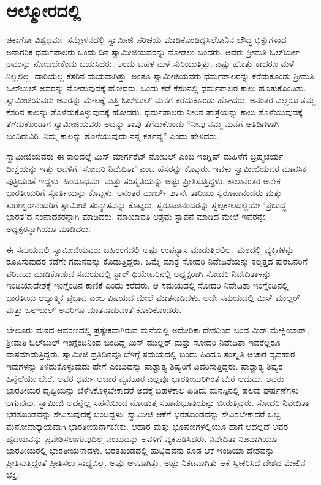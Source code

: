 
\chapter{ಆಲ್ಮೋರದಲ್ಲಿ}

 ಚಿಕಾಗೋ ವಿಶ್ವಧರ್ಮ ಸಮ್ಮೇಳನದಲ್ಲಿ ಸ್ವಾಮೀಜಿ ಪರಿಚಯ ಮಾಡಿಕೊಂಡಿದ್ದ\break ಸಿಲೋನಿನ ಬೌದ್ಧ ಭಿಕ್ಷುಗಳಾದ ಅನಾಗರಿಕ ಧರ್ಮಪಾಲರು ಒಂದು ದಿನ ಸ್ವಾಮೀಜಿಯವರನ್ನು ನೋಡಲು ಬಂದರು. ಅವರು ಶ‍್ರೀಮತಿ ಓಲ್‍ಬುಲ್ ಅವರನ್ನು ನೋಡಬೇಕೆಂದು ಬಯಸಿದರು. ಅಂದು ಬಹಳ ಮಳೆ ಸುರಿಯುತ್ತಿತ್ತು. ಎಷ್ಟು ಹೊತ್ತು ಕಾದರೂ ಮಳೆ ನಿಲ್ಲಲಿಲ್ಲ. ದಾರಿಯೆಲ್ಲ ಕೆಸರಿನ ಮಯವಾಗಿತ್ತು. ಅಂತೂ ಸ್ವಾಮೀಜಿಯವರು ಧರ್ಮಪಾಲರನ್ನು ಕರೆದುಕೊಂಡು ಶ‍್ರೀಮತಿ ಓಲ್‍ಬುಲ್ ಅವರನ್ನು ನೋಡುವುದಕ್ಕೆ ಹೋದರು. ಒಂದು ಕಡೆ ಕೆಸರಿನಲ್ಲಿ ಧರ್ಮಪಾಲರ ಕಾಲು ಹೂತುಕೊಂಡಿತು. ಸ್ವಾಮೀಜಿಯವರು ಅವರನ್ನು ಮೇಲಕ್ಕೆ ಎತ್ತಿ ಓಲ್‍ಬುಲ್ ಮನೆಗೆ ಕರೆದುಕೊಂಡು ಹೋದರು. ಅನಂತರ ಎಲ್ಲರೂ ತಮ್ಮ ಕೆಸರಿನ ಕಾಲನ್ನು ತೊಳೆದುಕೊಳ್ಳುವುದಕ್ಕೆ ಹೋದರು. ಧರ್ಮಪಾಲರು ನೀರಿನ ಪಾತ್ರೆಯನ್ನು ಕಾಲು ತೊಳೆಯುವುದಕ್ಕೆ ತೆಗೆದುಕೊಂಡಾಗ ಸ್ವಾಮೀಜಿಯವರು ಅದನ್ನು ತಾವು ತೆಗೆದುಕೊಂಡು “ನೀವು ನಮ್ಮ ಮನೆಗೆ ಅತಿಥಿಗಳಾಗಿ ಬಂದಿರುವಿರಿ. ನಿಮ್ಮ ಕಾಲನ್ನು ತೊಳೆಯುವುದು ನನ್ನ ಕರ್ತವ್ಯ” ಎಂದು ಹೇಳಿದರು. 

 ಸ್ವಾಮೀಜಿಯವರು ಈ ಕಾಲದಲ್ಲೆ ಮಿಸ್ ಮಾರ್ಗರೆಟ್ ನೋಬಲ್ ಎಂಬ ಇಂಗ್ಲಿಷ್ ಮಹಿಳೆಗೆ ಬ್ರಹ್ಮಚರ್ಯ ದೀಕ್ಷೆಯನ್ನು ಇತ್ತು ಅವಳಿಗೆ ‘ಸೋದರಿ ನಿವೇದಿತಾ’ ಎಂಬ ಹೆಸರನ್ನು ಕೊಟ್ಟರು. ಇವಳು ಸ್ವಾಮೀಜಿಯವರ ಮಾನಸಿಕ ಪುತ್ರಿಯಂತೆ ಇದ್ದಳು. ಹಿಂದೂಧರ್ಮ ಮತ್ತು ಸಂಸ್ಕೃತಿಯನ್ನು ಅಷ್ಟು ಪ್ರೀತಿಸುತ್ತಿದ್ದಳು. ಕಾಲಾನಂತರ ಅನೇಕ ಭಾರತೀಯರಿಗೆ ಸ್ಫೂರ್ತಿಯನ್ನು ಕೊಟ್ಟಳು. ಅನಂತರ ಮಾರ್ಚ್ ೨೯ನೇ ತಾರೀಖು ಸ್ವರೂಪಾನಂದರು ಮತ್ತು ಸುರೇಶ್ವರಾನಂದರಿಗೆ ಸ್ವಾಮೀಜಿ ಸಂನ್ಯಾಸವನ್ನು ಕೊಟ್ಟರು. ಸ್ವರೂಪಾನಂದರನ್ನು ಸ್ವಲ್ಪಕಾಲದಲ್ಲಿಯೇ ‘ಪ್ರಬುದ್ಧ ಭಾರತ’ದ ಸಂಪಾದಕರನ್ನಾಗಿ ಮಾಡಿದರು. ಮಾಯಾವತಿ ಆಶ್ರಮ ಸ್ಥಾಪನೆ ಮಾಡಿದ ಮೇಲೆ ಇವರನ್ನೇ ಅಧ್ಯಕ್ಷರನ್ನಾಗಿಯೂ ಮಾಡಿದರು. 

 ಈ ಸಮಯದಲ್ಲಿ ಸ್ವಾಮೀಜಿಯವರು ಬಹಿರಂಗದಲ್ಲಿ ಅಷ್ಟು ಉಪನ್ಯಾಸ ಮಾಡುತ್ತಿರಲಿಲ್ಲ. ಮಠದಲ್ಲಿ ವ್ಯಕ್ತಿಗಳನ್ನು ರೂಪಿಸುವುದರ ಕಡೆಗೇ ಗಮನವನ್ನು ಕೊಡುತ್ತಿದ್ದರು. ಒಮ್ಮೆ ಮಾತ್ರ ಸೋದರಿ ನಿವೇದಿತೆಯನ್ನು ಕಲ್ಕತ್ತದ ಪುರಜನರಿಗೆ ಪರಿಚಯ ಮಾಡಿಕೊಡುವ ಸಮಯದಲ್ಲಿ ಸ್ಟಾರ್ ಥಿಯೇಟರಿನಲ್ಲಿ ಅಧ್ಯಕ್ಷರಾಗಿ ಸೋದರಿ ನಿವೇದಿತಾಳನ್ನು ಇಂಡಿಯಾದೇಶಕ್ಕೆ ಇಂಗ್ಲೆಂಡಿನ ಕಾಣಿಕೆ ಎಂದು ಕರೆದರು. ಆ ಸಮಯದಲ್ಲಿ ಸೋದರಿ ನಿವೇದಿತಾ ಇಂಗ್ಲೆಂಡಿನಲ್ಲಿ ಭಾರತೀಯ ಆಧ್ಯಾತ್ಮಿಕ ಪ್ರಭಾವ ಎಂಬ ವಿಷಯದ ಮೇಲೆ ಮಾತನಾಡಿದಳು. ಅದೇ ಸಮಯದಲ್ಲಿ ಮಿಸ್ ಮುಲ್ಲರ್ ಮತ್ತು ಓಲ್‍ಬುಲ್ ಅವರಿಗೂ ಮಾತನಾಡುವಂತೆ ಕೋರಿಕೊಂಡರು. 

 ಬೇಲೂರು ಮಠದ ಆವರಣದಲ್ಲಿ ಪ್ರತ್ಯೇಕವಾಗಿರುವ ಮನೆಯಲ್ಲಿ ಅಮೇರಿಕಾ ದೇಶದಿಂದ ಬಂದ ಮಿಸ್ ಮೇಕ್ಲಿಯಾಡ್, ಶ‍್ರೀಮತಿ ಓಲ್‍ಬುಲ್ ಇಂಗ್ಲೆಂಡಿನಿಂದ ಬಂದಿದ್ದ ಮಿಸ್ ಮುಲ್ಲರ್ ಮತ್ತು ಸೋದರಿ ನಿವೇದಿತಾ ಇವರೆಲ್ಲರೂ ವಾಸಮಾಡು\-ತ್ತಿದ್ದರು. ಸ್ವಾಮೀಜಿ ಪ್ರತಿದಿನವೂ ಬೆಳಿಗ್ಗೆ ಸಮಯದಲ್ಲಿ ಬಂದು ಹಿಂದೂ ಸಂಸ್ಕೃತಿ ಆಚಾರ ವ್ಯವಹಾರ ಇವುಗಳನ್ನು ತಿಳಿದುಕೊಳ್ಳುವುದು ಹೇಗೆ ಎಂಬುದನ್ನು ಪಾಶ್ಚಾತ್ಯ ಶಿಷ್ಯರಿಗೆ ವಿವರಿಸುತ್ತಿದ್ದರು. ಪಾಶ್ಚಾತ್ಯ ಶಿಷ್ಯರ ಹಿನ್ನೆಲೆಯೇ ಬೇರೆ. ಅವರ ಧರ್ಮ ಆಚಾರ ವ್ಯವಹಾರ ಎಲ್ಲವೂ ಭಾರತೀಯರಿಗಿಂತ ಬೇರೆ ಆದುದು. ಅವರು ಭಾರತೀಯರ ದೃಷ್ಟಿಯನ್ನು ಬೆಳೆಸಿಕೊಳ್ಳಬೇಕಾದರೆ ಅದಕ್ಕೆ ಬಹಳಕಾಲ ಹಿಡಿದು ಮನಸ್ಸಿನಲ್ಲಿ ಹಲವು ಘರ್ಷಣೆಗಳು ಆಗುವುವು. ಸ್ವಾಮೀಜಿ ಅದನ್ನೆಲ್ಲ ಸಹನೆಯಿಂದ ನೋಡುತ್ತ ಸಹಾನುಭೂತಿಯನ್ನು ಬೀರುತ್ತಿದ್ದರು. ಸೋದರಿ ನಿವೇದಿತಾ ಭರತಖಂಡವನ್ನು ಸೇವಿಸುವುದಕ್ಕೆ ಬಂದಿದ್ದಳು. ಸ್ವಾಮೀಜಿ ಆಕೆಗೆ ಭರತಖಂಡವನ್ನು ಸೇವಿಸಬೇಕಾದರೆ ಒಬ್ಬ ಮನೋವಾಕ್ಕಾಯವಾಗಿ ಭಾರತೀಯನಾಗಬೇಕು. ಆಹಾರ ಮತ್ತು ಭೂಷಣಗಳಲ್ಲಿಯೂ ಹಾಗೆ ಆದಲ್ಲದೆ ಅವರ ಹೃದಯವನ್ನು ಪ್ರವೇಶಿಸಲಾಗುವುದಿಲ್ಲ ಎಂಬುದನ್ನು ಅವಳಿಗೆ ವ್ಯಕ್ತಪಡಿಸಿದರು. ನಿವೇದಿತಾ ನಿಜವಾಗಿಯೂ ಭಾರತೀಯರಲ್ಲಿ ಭಾರತೀಯಳಾದಳು. ಭರತಖಂಡದಲ್ಲಿ ಹುಟ್ಟಿದವನು ಕೂಡ ಆಕೆ ಇಂಡಿಯಾ ದೇಶವನ್ನು ಪ್ರೀತಿಸುತ್ತಿದ್ದಂತೆ ಪ್ರೀತಿಸಲು ಸಾಧ್ಯವಿಲ್ಲ. ಅಷ್ಟು ಆಳವಾಗಿತ್ತು, ಅಷ್ಟು ನಿಕಟವಾಗಿತ್ತು ಆಕೆ ಸ್ವೀಕರಿಸಿದ ದೇಶದ ಮೇಲಿನ ಭಕ್ತಿ. 

